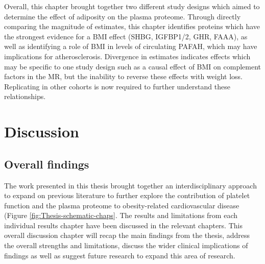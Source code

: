 \documentclass[11pt,twoside]{bristolthesis}
\begin{document}
Overall, this chapter brought together two different study designs which aimed to determine the effect of adiposity on the plasma proteome. Through directly comparing the magnitude of estimates, this chapter identifies proteins which have the strongest evidence for a BMI effect (SHBG, IGFBP1/2, GHR, FAAA), as well as identifying a role of BMI in levels of circulating PAFAH, which may have implications for atherosclerosis. Divergence in estimates indicates effects which may be specific to one study design such as a causal effect of BMI on complement factors in the MR, but the inability to reverse these effects with weight loss. Replicating in other cohorts is now required to further understand these relationships.

\hypertarget{Discussion}{%
\chapter{Discussion}\label{Discussion}}

\hypertarget{overall-findings}{%
\section{Overall findings}\label{overall-findings}}

The work presented in this thesis brought together an interdisciplinary approach to expand on previous literature to further explore the contribution of platelet function and the plasma proteome to obesity-related cardiovascular disease (Figure \ref{fig:Thesis-schematic-chaps}. The results and limitations from each individual results chapter have been discussed in the relevant chapters. This overall discussion chapter will recap the main findings from the thesis, address the overall strengths and limitations, discuss the wider clinical implications of findings as well as suggest future research to expand this area of research.
\end{document}
